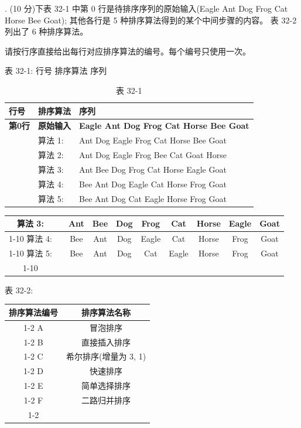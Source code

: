 . (10 分)下表 32-1 中第 0 行是待排序序列的原始输入(Eagle Ant Dog Frog Cat Horse Bee Goat); 其他各行是 5 种排序算法得到的某个中间步骤的内容。 表 32-2 列出了 6 种排序算法。

请按行序直接给出每行对应排序算法的编号。每个编号只使用一次。

表 32-1: 行号 排序算法 序列

\begin{table}[htbp]
\centering
\caption{表 32-1}
\begin{tabular}{lll}
\toprule
行号 & 排序算法 & 序列 \\
\midrule
\textbf{第0行} & \textbf{原始输入} & \textbf{Eagle Ant Dog Frog Cat Horse Bee Goat} \\
\midrule
& 算法 1: & Ant Dog Eagle Frog Cat Horse Bee Goat \\
& 算法 2: & Ant Dog Eagle Frog Bee Cat Goat Horse \\
& 算法 3: & Ant Bee Dog Frog Cat Horse Eagle Goat \\
& 算法 4: & Bee Ant Dog Eagle Cat Horse Frog Goat \\
& 算法 5: & Bee Ant Dog Cat Eagle Horse Frog Goat \\
\bottomrule
\end{tabular}
\end{table}

\begin{center}
\begin{tabular}{|c|c|c|c|c|c|c|c|c|c|}
\hline
算法 3: & \phantom{X} & Ant & Bee & Dog & Frog & Cat & Horse & Eagle & Goat \\
\cline{1-10}
算法 4: & \phantom{X} & Bee & Ant & Dog & Eagle & Cat & Horse & Frog & Goat \\
\cline{1-10}
算法 5: & \phantom{X} & Bee & Ant & Dog & Cat & Eagle & Horse & Frog & Goat \\
\cline{1-10}
\hline
\end{tabular}
\end{center}

表 32-2:

\begin{center}
\begin{tabular}{|c|c|}
\hline
排序算法编号 & 排序算法名称 \\
\cline{1-2}
A & 冒泡排序 \\
\cline{1-2}
B & 直接插入排序 \\
\cline{1-2}
C & 希尔排序(增量为 3, 1) \\
\cline{1-2}
D & 快速排序 \\
\cline{1-2}
E & 简单选择排序 \\
\cline{1-2}
F & 二路归并排序 \\
\cline{1-2}
\hline
\end{tabular}

\end{center}
\vspace{20em}

